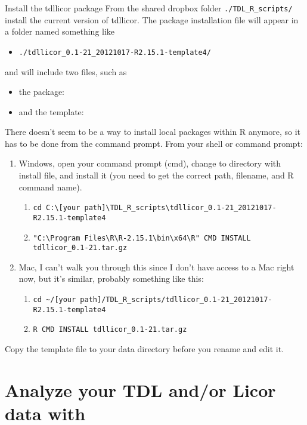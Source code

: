 Install the tdllicor package
From the shared dropbox folder \verb|./TDL_R_scripts/| install the current version of tdllicor.
The package installation file will appear in a folder named something like
\begin{itemize}
\item \verb|./tdllicor_0.1-21_20121017-R2.15.1-template4/|
\end{itemize}
and will include two files, such as
\begin{itemize}
\item the package: 
\item and the template: 
\end{itemize}

There doesn't seem to be a way to install local packages within R anymore, so it has to be done from the command prompt.
From your shell or command prompt:
\begin{enumerate}
\item Windows, open your command prompt (cmd), change to directory with install file, and install it (you need to get the correct path, filename, and R command name).
  \begin{enumerate}
  \item {\footnotesize \verb|cd C:\[your path]\TDL_R_scripts\tdllicor_0.1-21_20121017-R2.15.1-template4| }
  \item {\footnotesize \verb|"C:\Program Files\R\R-2.15.1\bin\x64\R" CMD INSTALL tdllicor_0.1-21.tar.gz| }
  \end{enumerate}
\item Mac, I can't walk you through this since I don't have access to a Mac right now, but it's similar, probably something like this:
  \begin{enumerate}
  \item {\footnotesize \verb|cd ~/[your path]/TDL_R_scripts/tdllicor_0.1-21_20121017-R2.15.1-template4| }
  \item {\footnotesize \verb|R CMD INSTALL tdllicor_0.1-21.tar.gz| }
  \end{enumerate}
\end{enumerate}

Copy the template file to your data directory before you rename and edit it.


\section{Analyze your TDL and/or Licor data with \tdllicor}

